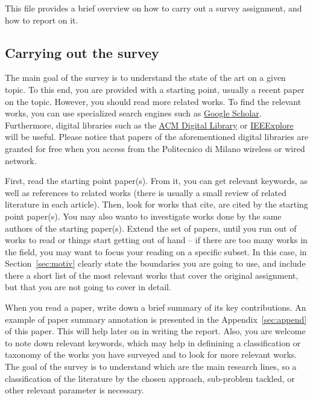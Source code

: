 This file provides a brief overview on how to carry out a survey assignment, and how to report on it.

\subsection{Carrying out the survey} %
The main goal of the survey is to understand the state of the art on a given topic. 
To this end, you are provided with a starting point, usually a recent paper on the topic. 
However, you should read more related works.
To find the relevant works, you can use specialized search engines such as  \href{https://scholar.google.com}{Google Scholar}.
Furthermore, digital libraries such as the \href{https://dl.acm.org}{ACM Digital Library} or \href{https://ieeexplore.ieee.org}{IEEExplore} will be useful.
Please notice that papers of the aforementioned digital libraries are granted for free when you access from the Politecnico di Milano wireless or wired network.

First, read the starting point paper(s). 
From it, you can get relevant keywords, as well as references to related works (there is usually a small review of related literature in each article).
Then, look for works that cite, are cited by the starting point paper(s). You may also wanto to investigate works done by the same authors of the starting paper(s).
Extend the set of papers, until you run out of works to read or things start getting out of hand -- if there are too many works in the field, you may want to focus your reading on a specific subset. In this case, in Section~\ref{sec:motiv} clearly state the boundaries you are going to use, and include there a short list of the most relevant works that cover the original assignment, but that you are not going to cover in detail.

When you read a paper, write down a brief summary of its key contributions. 
An example of paper summary annotation is presented in the Appendix~\ref{sec:append} of this paper.
This will help later on in writing the report.
Also, you are welcome to note down relevant keywords, which may help in definining a classification or taxonomy of the works you have surveyed and to look for more relevant works.
The goal of the survey is to understand which are the main research lines, so a classification of the literature by the chosen approach, sub-problem tackled, or other relevant parameter is necessary.

